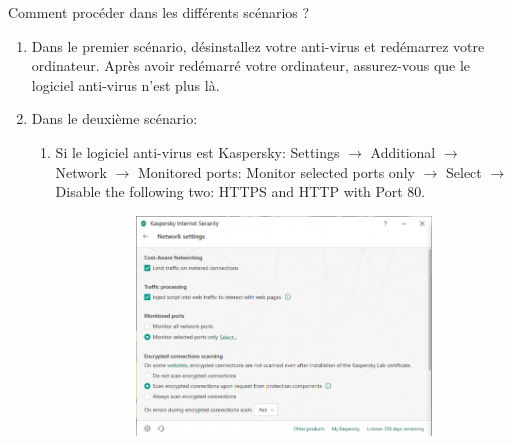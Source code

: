 \documentclass{article}
\begin{document}
Comment procéder dans les différents scénarios ?
\begin{enumerate}
\item Dans le premier scénario, désinstallez votre anti-virus et redémarrez votre ordinateur. Après avoir redémarré votre ordinateur, assurez-vous que le logiciel anti-virus n'est plus là.
\item Dans le deuxième scénario:
\begin{enumerate}
\item Si le logiciel anti-virus est Kaspersky: Settings $\rightarrow$ Additional $\rightarrow$ Network $\rightarrow$ Monitored ports: Monitor selected ports only $\rightarrow$ Select $\rightarrow$ Disable the following two: HTTPS  and HTTP with Port 80. 
\begin{figure}[H]
\begin{subfigure}[c]{0.7\textwidth}
\includegraphics[width=1\textwidth]{Plots/Kasp1.png}
\end{subfigure}
\begin{subfigure}[c]{0.3\textwidth}

\end{subfigure}
\end{figure}
\end{enumerate}
\end{enumerate}
\end{document}
